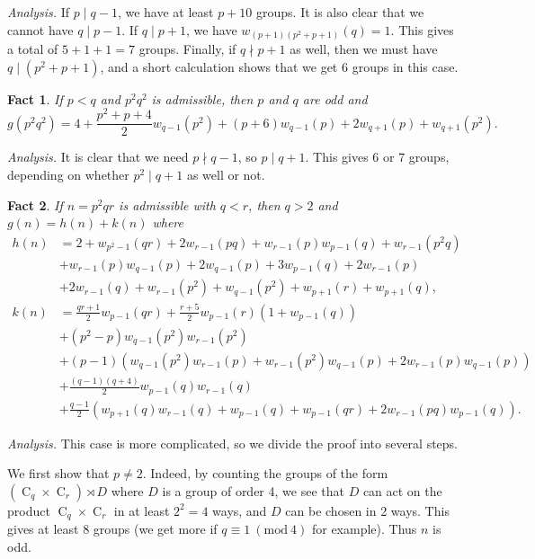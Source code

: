 \documentclass{article}
\newcommand{\cyc}[1]{\operatorname{C}_{#1}}
\newcommand{\Mod}[1]{\ (\mathrm{mod} \ #1)}
\theoremstyle{plain}
\newtheorem{eufact}{Fact}[section]
\theoremstyle{definition}
\begin{document}
\textit{Analysis.} If $p \mid q - 1$, we have at least $p + 10$ groups. It is also clear that we cannot have $q \mid p - 1$. If $q \mid p + 1$, we have $w_{(p + 1)(p^2 + p + 1)}(q) = 1$. This gives a total of $5 + 1 + 1 = 7$ groups. Finally, if $q \nmid p + 1$ as well, then we must have $q \mid (p^2 + p + 1)$, and a short calculation shows that we get $6$ groups in this case.

\begin{eufact}
	If $p < q$ and $p^2 q^2$ is admissible, then $p$ and $q$ are odd and
	\[g(p^2 q^2) = 4 + \frac{p^2 + p + 4}{2} w_{q - 1}(p^2) + (p + 6)w_{q - 1}(p) + 2w_{q + 1}(p) + w_{q + 1}(p^2).\]
\end{eufact}

\textit{Analysis.} It is clear that we need $p \nmid q - 1$, so $p \mid q + 1$. This gives 6 or 7 groups, depending on whether $p^2 \mid q + 1$ as well or not.

\begin{eufact} 
	If $n = p^2 q r$ is admissible with $q < r$, then $q > 2$ and $g(n) = h(n) + k(n)$ where$$\begin{aligned}
		h(n) &= 2 + w_{p^2 - 1}(qr) + 2w_{r - 1}(pq) + w_{r - 1}(p)w_{p - 1}(q) + w_{r - 1}(p^2 q) \\ 
		&+ w_{r - 1}(p)w_{q - 1}(p) + 2w_{q - 1}(p) + 3w_{p - 1}(q) + 2w_{r - 1}(p) \\ 
		&+ 2w_{r - 1}(q) + w_{r - 1}(p^2) + w_{q - 1}(p^2) + w_{p + 1}(r) + w_{p + 1}(q), \\
		k(n) &= \frac{qr + 1}{2} w_{p - 1}(qr) + \frac{r + 5}{2} w_{p - 1}(r)(1 + w_{p - 1}(q))\\
		&+ (p^2 - p)w_{q - 1}(p^2)w_{r - 1}(p^2) \\
		&+ (p - 1)(w_{q - 1}(p^2)w_{r - 1}(p) + w_{r - 1}(p^2)w_{q - 1}(p) + 2w_{r - 1}(p)w_{q - 1}(p)) \\
		&+ \frac{(q - 1)(q + 4)}{2} w_{p - 1}(q)w_{r - 1}(q) \\
		&+ \frac{q - 1}{2} (w_{p + 1}(q)w_{r - 1}(q) + w_{p - 1}(q) + w_{p - 1}(qr) + 2w_{r - 1}(pq)w_{p - 1}(q)).
	\end{aligned}$$
\end{eufact}

\textit{Analysis.} This case is more complicated, so we divide the proof into several steps.

We first show that $p \neq 2$. Indeed, by counting the groups of the form $(\cyc{q} \times \cyc{r}) \rtimes D$ where $D$ is a group of order 4, we see that $D$ can act on the product $\cyc{q} \times \cyc{r}$ in at least $2^2 = 4$ ways, and $D$ can be chosen in 2 ways. This gives at least 8 groups (we get more if $q \equiv 1 \Mod{4}$ for example). Thus $n$ is odd.
\end{document}
